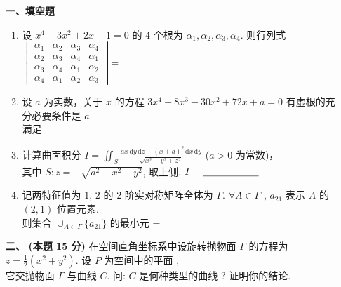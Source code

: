 \documentclass[UTF8]{ctexart}
\begin{document}
\begin{enumerate}[labelsep=-0.2em,leftmargin=2em,align=left]
\item[{\textbf{一、填空题}}]  
\begin{enumerate}[label={\arabic*.},labelsep=-1.7em,leftmargin=1.0em,align=left]
			\item 设 $x^4+3x^2+2x+1=0$ 的 $4$ 个根为 $\alpha_1,\alpha_2,\alpha_3,\alpha_4$. 则行列式 $\begin{vmatrix}\alpha_1&\alpha_2&\alpha_3&\alpha_4\\
			\alpha_2&\alpha_3&\alpha_4&\alpha_1\\
			\alpha_3&\alpha_4&\alpha_1&\alpha_2\\
			\alpha_4&\alpha_1&\alpha_2&\alpha_3
			\end{vmatrix}$\;=\;\underline{\hspace{2cm}}
			\item
			设 $a$ 为实数，关于 $x$ 的方程 $3x^4-8x^3-30x^2+72x+a=0$ 有虚根的充分必要条件是 $a$ \\
			满足\;\blank
			\item 计算曲面积分 $I=\iint_S\frac{ax\,\mathrm{d}y\,\mathrm{d}z+(x+a)^2\,\mathrm{d}x\,\mathrm{d}y}{\sqrt{x^2+y^2+z^2}}$ ($a>0$ 为常数)，\\[2mm]其中 $S:z=-\sqrt{a^2-x^2-y^2}$, 取上侧. $I=\underline{\hspace{2cm}}$
			\item 记两特征值为 $1$, $2$ 的 $2$ 阶实对称矩阵全体为 $\Gamma$. $\forall A\in\Gamma$ , $a_{21}$ 表示 $A$ 的 $(2,1)$ 位置元素. \\
			则集合 $\cup_{A\in\Gamma}\{a_{21}\}$ 的最小元 = \blank
		\end{enumerate}
\item[{ \textbf{二、}}] {\textbf{(本题 15 分)}} 在空间直角坐标系中设旋转抛物面 $\Gamma$ 的方程为 $z=\tfrac{1}{2}(x^2+y^2)$. 设 $P$ 为空间中的平面 , \\
		它交抛物面 $\Gamma$ 与曲线 $C$. 问: $C$ 是何种类型的曲线 ? 证明你的结论.
		

\end{enumerate}
\end{document}
